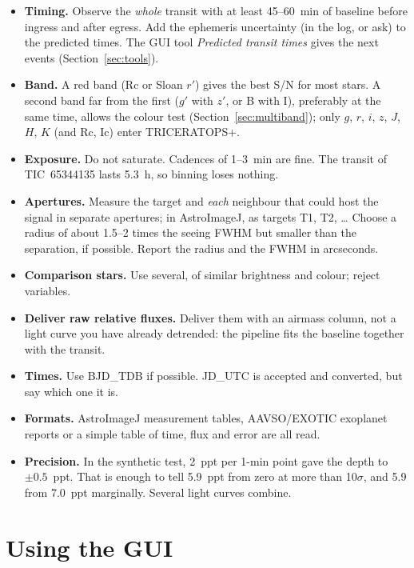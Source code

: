 \documentclass[11pt,a4paper]{report}
\begin{document}
\begin{itemize}
\item \textbf{Timing.} Observe the \emph{whole} transit with at least
45--60~min of baseline before ingress and after egress. Add the ephemeris
uncertainty (in the log, or ask) to the predicted times. The GUI tool
\emph{Predicted transit times} gives the next events
(Section~\ref{sec:tools}).
\item \textbf{Band.} A red band (Rc or Sloan $r'$) gives the best S/N for
most stars. A second band far from the first ($g'$ with $z'$, or B with I),
preferably at the same time, allows the colour test
(Section~\ref{sec:multiband}); only $g$, $r$, $i$, $z$, $J$, $H$, $K$ (and
Rc, Ic) enter TRICERATOPS+.
\item \textbf{Exposure.} Do not saturate. Cadences of 1--3~min are fine. The
transit of TIC~65344135 lasts 5.3~h, so binning loses nothing.
\item \textbf{Apertures.} Measure the target and \emph{each} neighbour that
could host the signal in separate apertures; in AstroImageJ, as targets T1,
T2, \ldots{} Choose a radius of about 1.5--2 times the seeing FWHM but
smaller than the separation, if possible. Report the radius and the FWHM in
arcseconds.
\item \textbf{Comparison stars.} Use several, of similar brightness and
colour; reject variables.
\item \textbf{Deliver raw relative fluxes.} Deliver them with an airmass
column, not a light curve you have already detrended: the pipeline fits the
baseline together with the transit.
\item \textbf{Times.} Use BJD\_TDB if possible. JD\_UTC is accepted and
converted, but say which one it is.
\item \textbf{Formats.} AstroImageJ measurement tables, AAVSO/EXOTIC
exoplanet reports or a simple table of time, flux and error are all read.
\item \textbf{Precision.} In the synthetic test, 2~ppt per 1-min point gave
the depth to $\pm0.5$~ppt. That is enough to tell 5.9~ppt from zero at more
than 10$\sigma$, and 5.9 from 7.0~ppt marginally. Several light curves
combine.
\end{itemize}



\part{Using the GUI}
\end{document}
